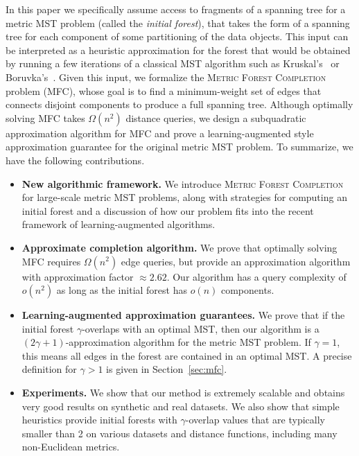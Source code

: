 In this paper we specifically assume access to fragments of a spanning tree for a metric MST problem (called the \emph{initial forest}), that takes the form of a spanning tree for each component of some partitioning of the data objects. This input can be interpreted as a heuristic approximation for the forest that would be obtained by running a few iterations of a classical MST algorithm such as Kruskal's~\cite{kruskal1956shortest} or Boruvka's~\cite{boruvka1926jistem}. Given this input, we formalize the \textsc{Metric Forest Completion} problem (MFC), whose goal is to find a minimum-weight set of edges that connects disjoint components to produce a full spanning tree.
Although optimally solving MFC takes $\Omega(n^2)$ distance queries, we design a subquadratic approximation algorithm for MFC and prove a learning-augmented style approximation guarantee for the original metric MST problem. To summarize, we have the following contributions. 
\begin{itemize}[leftmargin=10pt,itemsep=0pt]
	\item \textbf{New algorithmic framework.} We introduce \textsc{Metric Forest Completion} for large-scale metric MST problems, along with strategies for computing an initial forest and a discussion of how our problem fits into the recent framework of learning-augmented algorithms.
	\item \textbf{Approximate completion algorithm.}  We prove that optimally solving MFC requires $\Omega(n^2)$ edge queries, but provide an approximation algorithm with approximation factor $\approx 2.62$. Our algorithm has a query complexity of $o(n^2)$ as long as the initial forest has $o(n)$ components. 
	\item \textbf{Learning-augmented approximation guarantees.} We prove that if the initial forest $\gamma$-overlaps with an optimal MST, then our algorithm is a $(2\gamma+1)$-approximation algorithm for the metric MST problem. If $\gamma = 1$, this means all edges in the forest are contained in an optimal MST. A precise definition for $\gamma > 1$ is given in Section~\ref{sec:mfc}.
	\item \textbf{Experiments.} We show that our method is extremely scalable and obtains very good results on synthetic and real datasets. We also show that simple heuristics provide initial forests with $\gamma$-overlap values that are typically smaller than 2 on various datasets and distance functions, including many non-Euclidean metrics.
\end{itemize}
